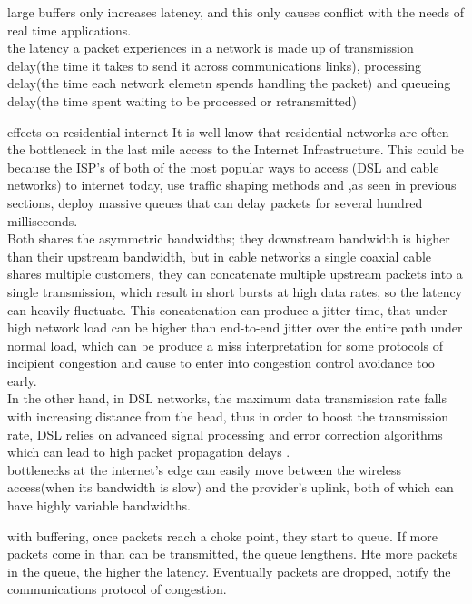
large buffers only increases latency, and this only causes conflict with the needs of real time applications.\\

the latency a packet experiences in a network is made up of transmission delay(the time it takes to send it across communications links), processing delay(the time each network elemetn spends handling the packet) and queueing delay(the time spent waiting to be processed or retransmitted)



effects on residential internet \cite{Dischinger2007CRB}
It is well know that residential networks are often the bottleneck in the last
mile access to the Internet Infrastructure. This could be because the ISP's of
both of the most popular ways to access (DSL and cable networks) to internet
today, use traffic shaping methods and ,as seen in previous sections, deploy
massive queues that can delay packets for several hundred milliseconds.\\

Both shares the asymmetric bandwidths; they downstream bandwidth is higher than
their upstream bandwidth, but in cable networks a single coaxial cable shares
multiple customers, they can concatenate multiple upstream packets into a single
transmission, which result in short bursts at high data rates, so the latency
can heavily fluctuate. This concatenation can produce a jitter time, that under
high network load can be higher than end-to-end jitter over the entire path
under normal load, which can be produce a miss interpretation for some protocols
of incipient congestion and cause to enter into congestion control avoidance too
early.\\

In the other hand, in DSL networks, the maximum data transmission
rate falls with increasing distance from the head, thus in order to boost the
transmission rate, DSL relies on advanced signal processing and error correction
algorithms which can lead to high packet propagation delays .\\


bottlenecks at the internet's edge can easily move between the wireless access(when its bandwidth is slow) and the provider's uplink, both of which can have highly variable bandwidths.


with buffering, once packets reach a choke point, they start to queue. If more packets come in than can be transmitted, the queue lengthens. Hte more packets in the queue, the higher the latency. Eventually packets are dropped, notify the communications protocol of congestion.



